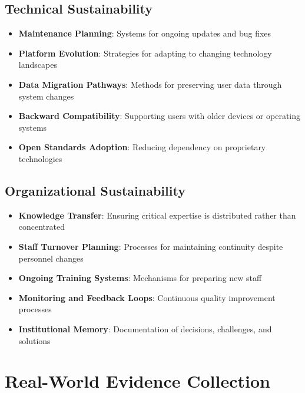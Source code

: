 \subsection{Technical Sustainability}
\begin{itemize}
    \item \textbf{Maintenance Planning}: Systems for ongoing updates and bug fixes
    
    \item \textbf{Platform Evolution}: Strategies for adapting to changing technology landscapes
    
    \item \textbf{Data Migration Pathways}: Methods for preserving user data through system changes
    
    \item \textbf{Backward Compatibility}: Supporting users with older devices or operating systems
    
    \item \textbf{Open Standards Adoption}: Reducing dependency on proprietary technologies
\end{itemize}

\subsection{Organizational Sustainability}
\begin{itemize}
    \item \textbf{Knowledge Transfer}: Ensuring critical expertise is distributed rather than concentrated
    
    \item \textbf{Staff Turnover Planning}: Processes for maintaining continuity despite personnel changes
    
    \item \textbf{Ongoing Training Systems}: Mechanisms for preparing new staff
    
    \item \textbf{Monitoring and Feedback Loops}: Continuous quality improvement processes
    
    \item \textbf{Institutional Memory}: Documentation of decisions, challenges, and solutions
\end{itemize}

\section{Real-World Evidence Collection}
